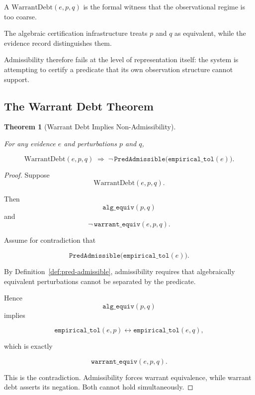 \documentclass[12pt]{article}
\theoremstyle{plain}
\newtheorem{theorem}{Theorem}[section]
\theoremstyle{definition}
\theoremstyle{remark}
\newcommand{\WD}{\mathrm{WarrantDebt}}
\begin{document}
A $\WD(e,p,q)$ is the formal witness that the observational regime is
too coarse.

The algebraic certification infrastructure treats $p$ and $q$ as
equivalent, while the evidence record distinguishes them.

Admissibility therefore fails at the level of representation itself:
the system is attempting to certify a predicate that its own
observation structure cannot support.

\subsection{The Warrant Debt Theorem}
\label{subsec:wdt}

\begin{theorem}[Warrant Debt Implies Non-Admissibility]
\label{thm:wdt}

For any evidence $e$ and perturbations $p$ and $q$,

\[
\WD(e,p,q)
\;\Rightarrow\;
\neg\,
\mathtt{PredAdmissible}
\bigl(
\mathtt{empirical\_tol}(e)
\bigr).
\]

\end{theorem}

\begin{proof}

Suppose
\[
\WD(e,p,q).
\]

Then
\[
\mathtt{alg\_equiv}(p,q)
\]
and
\[
\neg\,\mathtt{warrant\_equiv}(e,p,q).
\]

Assume for contradiction that

\[
\mathtt{PredAdmissible}
\bigl(
\mathtt{empirical\_tol}(e)
\bigr).
\]

By Definition~\ref{def:pred-admissible}, admissibility requires that
algebraically equivalent perturbations cannot be separated by the
predicate.

Hence
\[
\mathtt{alg\_equiv}(p,q)
\]
implies

\[
\mathtt{empirical\_tol}(e,p)
\leftrightarrow
\mathtt{empirical\_tol}(e,q),
\]

which is exactly

\[
\mathtt{warrant\_equiv}(e,p,q).
\]

This is the contradiction.
Admissibility forces warrant equivalence, while warrant debt asserts
its negation.
Both cannot hold simultaneously.

\end{proof}
\end{document}

